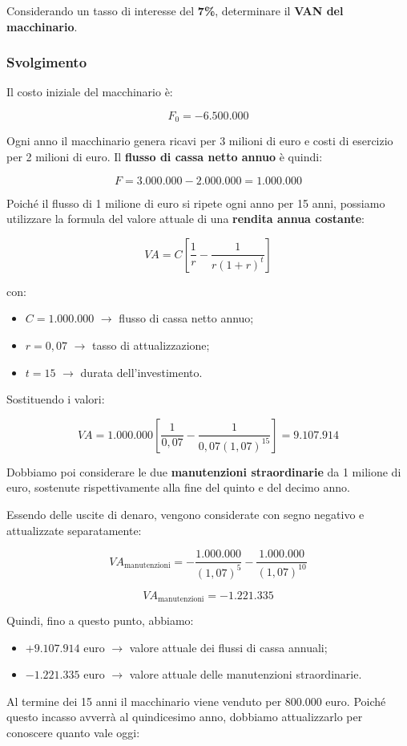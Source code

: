 \noindent Considerando un tasso di interesse del \textbf{7\%}, determinare il \textbf{VAN del macchinario}.

\subsubsection*{Svolgimento}

\noindent Il costo iniziale del macchinario è:

\[
F_0=-6.500.000
\]

\noindent Ogni anno il macchinario genera ricavi per 3 milioni di euro e costi di esercizio per 2 milioni di euro. Il \textbf{flusso di cassa netto annuo} è quindi:

\[
F=3.000.000-2.000.000=1.000.000
\]

\noindent Poiché il flusso di 1 milione di euro si ripete ogni anno per 15 anni, possiamo utilizzare la formula del valore attuale di una \textbf{rendita annua costante}:

\[
VA=C\left[\frac{1}{r}-\frac{1}{r(1+r)^t}\right]
\]

\noindent con:
\begin{itemize}
    \item $C=1.000.000$ $\rightarrow$ flusso di cassa netto annuo;
    \item $r=0,07$ $\rightarrow$ tasso di attualizzazione;
    \item $t=15$ $\rightarrow$ durata dell'investimento.
\end{itemize}

\noindent Sostituendo i valori:

\[
VA=
1.000.000
\left[
\frac{1}{0,07}
-
\frac{1}{0,07(1,07)^{15}}
\right]
=9.107.914
\]

\noindent Dobbiamo poi considerare le due \textbf{manutenzioni straordinarie} da 1 milione di euro, sostenute rispettivamente alla fine del quinto e del decimo anno.

\noindent Essendo delle uscite di denaro, vengono considerate con segno negativo e attualizzate separatamente:

\[
VA_{\text{manutenzioni}}
=
-\frac{1.000.000}{(1,07)^5}
-\frac{1.000.000}{(1,07)^{10}}
\]

\[
VA_{\text{manutenzioni}}
=-1.221.335
\]

\noindent Quindi, fino a questo punto, abbiamo:
\begin{itemize}
    \item $+9.107.914$ euro $\rightarrow$ valore attuale dei flussi di cassa annuali;
    \item $-1.221.335$ euro $\rightarrow$ valore attuale delle manutenzioni straordinarie.
\end{itemize}
\noindent Al termine dei 15 anni il macchinario viene venduto per 800.000 euro.
Poiché questo incasso avverrà al quindicesimo anno, dobbiamo attualizzarlo per
conoscere quanto vale oggi:

